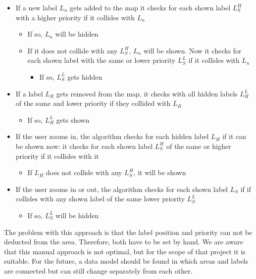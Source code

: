 \begin{itemize}
  \item If a new label $L_n$ gets added to the map it checks for each shown label $L_S^H$ with a higher priority if it collides with $L_n$
  \begin{itemize}
    \item If so, $L_n$ will be hidden
    \item If it does not collide with any $L_S^H$, $L_n$ will be shown. Now it checks for each shown label with the same or lower priority $L_S^L$ if it collides with $L_n$
    \begin{itemize}
      \item If so, $L_S^L$ gets hidden
    \end{itemize}
  \end{itemize}
  \item If a label $L_R$ gets removed from the map, it checks with all hidden labels $L_H^L$ of the same and lower priority if they collided with $L_R$
  \begin{itemize}
    \item If so, $L_H^L$ gets shown
  \end{itemize}
  \item If the user zooms in, the algorithm checks for each hidden label $L_H$ if it can be shown now: it checks for each shown label $L_S^H$ of the same or higher priority if it collides with it
  \begin{itemize}
    \item If $L_H$ does not collide with any $L_S^H$, it will be shown
  \end{itemize}
  \item If the user zooms in or out, the algorithm checks for each shown label $L_S$ if if collides with any shown label of the same lower priority $L_S^L$
  \begin{itemize}
    \item If so, $L_S^L$ will be hidden
  \end{itemize}

\end{itemize}

The problem with this approach is that the label position and priority can not be deducted from the area. Therefore, both have to be set by hand. We are aware that this manual approach is not optimal, but for the scope of that project it is suitable. For the future, a data model should be found in which areas and labels are connected but can still change separately from each other.

